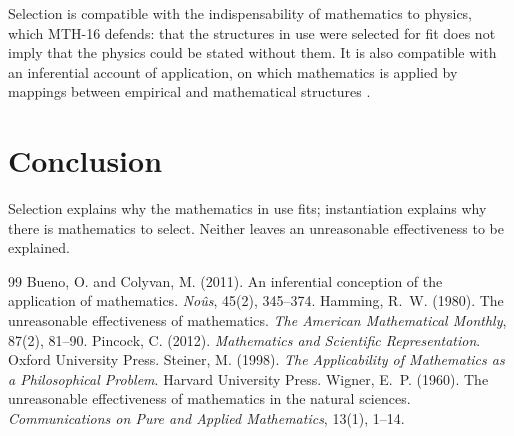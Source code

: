 \documentclass{situationist-preprint}
\begin{document}
Selection is compatible with the indispensability of mathematics to physics, which MTH-16 defends: that the structures in use were selected for fit does not imply that the physics could be stated without them. It is also compatible with an inferential account of application, on which mathematics is applied by mappings between empirical and mathematical structures \citep{BuenoColyvan2011}.

\section{Conclusion}

Selection explains why the mathematics in use fits; instantiation explains why there is mathematics to select. Neither leaves an unreasonable effectiveness to be explained.

\begin{thebibliography}{99}\small
{} Bueno, O. and Colyvan, M. (2011). An inferential conception of the application of mathematics. \emph{No\^{u}s}, 45(2), 345--374.
 Hamming, R.~W. (1980). The unreasonable effectiveness of mathematics. \emph{The American Mathematical Monthly}, 87(2), 81--90.
 Pincock, C. (2012). \emph{Mathematics and Scientific Representation}. Oxford University Press.
 Steiner, M. (1998). \emph{The Applicability of Mathematics as a Philosophical Problem}. Harvard University Press.
 Wigner, E.~P. (1960). The unreasonable effectiveness of mathematics in the natural sciences. \emph{Communications on Pure and Applied Mathematics}, 13(1), 1--14.
\end{thebibliography}
\end{document}
